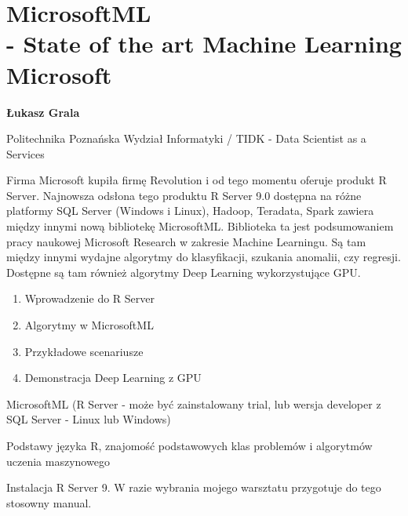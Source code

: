 \documentclass[\main/boa.tex]{subfiles}
\begin{document}
\section[MicrosoftML - State of the art Machine Learning Microsoft]{MicrosoftML \\- State of the art Machine Learning Microsoft}

\begin{minipage}{0.915\textwidth}
\centering
{\bf {} Łukasz Grala}
\end{minipage}

\vskip 0.3cm

\begin{affiliations}
\begin{minipage}{0.915\textwidth}
\centering
\large Politechnika Poznańska Wydział Informatyki / TIDK - Data Scientist as a Services  \\[2pt]
\end{minipage}
\end{affiliations}

\vskip 0.8cm

\opiswarsztatu Firma Microsoft kupiła firmę Revolution i od tego momentu oferuje produkt R Server. Najnowsza odsłona tego produktu R Server 9.0 dostępna na różne platformy SQL Server (Windows i Linux), Hadoop, Teradata, Spark zawiera między innymi nową bibliotekę MicrosoftML. Biblioteka ta jest podsumowaniem pracy naukowej Microsoft Research w zakresie Machine Learningu. Są tam między innymi wydajne algorytmy do klasyfikacji, szukania anomalii, czy regresji. Dostępne są tam również algorytmy Deep Learning wykorzystujące GPU.

\planwarsztatu
\begin{enumerate}
\item Wprowadzenie do R Server
\item Algorytmy w MicrosoftML
\item Przykładowe scenariusze
\item Demonstracja Deep Learning z GPU
\end{enumerate}	 

\pakiety MicrosoftML (R Server - może być zainstalowany trial, lub wersja developer z SQL Server - Linux lub Windows)

\umiejetnosci Podstawy języka R, znajomość podstawowych klas problemów i algorytmów uczenia maszynowego

\wymagania Instalacja R Server 9. W razie wybrania mojego warsztatu przygotuje do tego stosowny manual.
\end{document}
